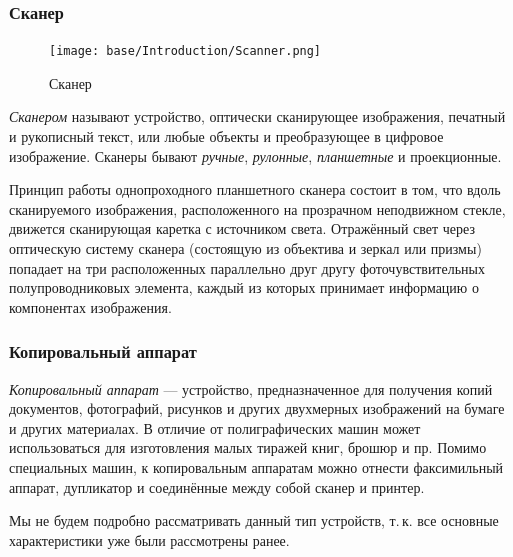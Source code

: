 \subsubsection{Сканер}\label{base:introduction:components:printers:scanner}
\begin{figure}
 \centering
 \texttt{[image: base/Introduction/Scanner.png]}
 \caption{Сканер}\label{base:introduction:components:printers:printerpic}
\end{figure}

\emph{Сканером} называют устройство, оптически сканирующее изображения, печатный и рукописный текст, или любые объекты и преобразующее в цифровое изображение. Сканеры бывают \emph{ручные}, \emph{рулонные}, \emph{планшетные} и проекционные.

Принцип работы однопроходного планшетного сканера состоит в том, что вдоль сканируемого изображения, расположенного на прозрачном неподвижном стекле, движется сканирующая каретка с источником света.
Отражённый свет через оптическую систему сканера (состоящую из объектива и зеркал или призмы) попадает на три расположенных параллельно друг другу фоточувствительных полупроводниковых элемента, каждый из которых принимает информацию о компонентах изображения.

\subsubsection{Копировальный аппарат}\label{base:introduction:components:printers:copier}
\emph{Копировальный аппарат} --- устройство, предназначенное для получения копий документов, фотографий, рисунков и других двухмерных изображений на бумаге и других материалах.
В отличие от полиграфических машин может использоваться для изготовления малых тиражей книг, брошюр и пр.
Помимо специальных машин, к копировальным аппаратам можно отнести факсимильный аппарат, дупликатор и соединённые между собой сканер и принтер.

Мы не будем подробно рассматривать данный тип устройств, т.\,к. все основные характеристики уже были рассмотрены ранее.
